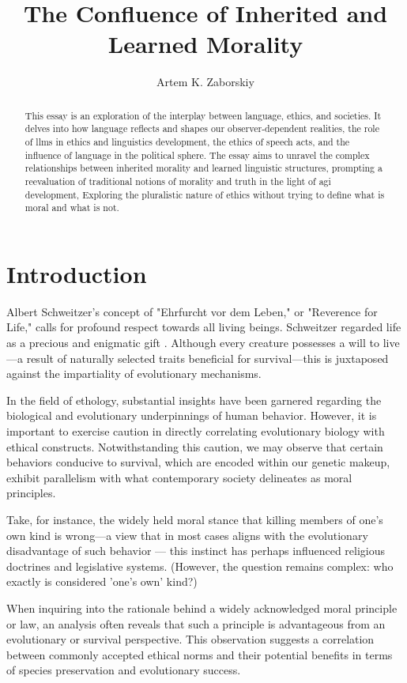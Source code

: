 \documentclass[12pt,a4]{article}
\begin{document}
\title{The Confluence of Inherited and Learned Morality}

\author{Artem K. Zaborskiy }


\maketitle

\begin{abstract}
This essay is an exploration of the interplay between language, ethics, and societies. It delves into how language reflects and shapes our observer-dependent realities, the role of \ac{llms} in ethics and linguistics development, the ethics of speech acts, and the influence of language in the political sphere. The essay aims to unravel the complex relationships between inherited morality and learned linguistic structures, prompting a reevaluation of traditional notions of morality and truth in the light of \ac{agi} development, Exploring the pluralistic nature of ethics without trying to define what is moral and what is not. 
\end{abstract}

\tableofcontents
\printacronyms


\section{Introduction}

Albert Schweitzer's concept of "Ehrfurcht vor dem Leben," or "Reverence for Life," calls for profound respect towards all living beings. Schweitzer regarded life as a precious and enigmatic gift \cite{1}. Although every creature possesses a will to live—a result of naturally selected traits beneficial for survival—this is juxtaposed against the impartiality of evolutionary mechanisms.
\par 
In the field of ethology, substantial insights have been garnered regarding the biological and evolutionary underpinnings of human behavior. However, it is important to exercise caution in directly correlating evolutionary biology with ethical constructs. Notwithstanding this caution, we may observe that certain behaviors conducive to survival, which are encoded within our genetic makeup, exhibit parallelism with what contemporary society delineates as moral principles.

\par Take, for instance, the widely held moral stance that killing members of one's own kind is wrong—a view that in most cases aligns with the evolutionary disadvantage of such behavior — this instinct has perhaps influenced religious doctrines and legislative systems. 
(However, the question remains complex: who exactly is considered 'one's own' kind?)
\par
When inquiring into the rationale behind a widely acknowledged moral principle or law, an analysis often reveals that such a principle is advantageous from an evolutionary or survival perspective. This observation suggests a correlation between commonly accepted ethical norms and their potential benefits in terms of species preservation and evolutionary success.
\end{document}
